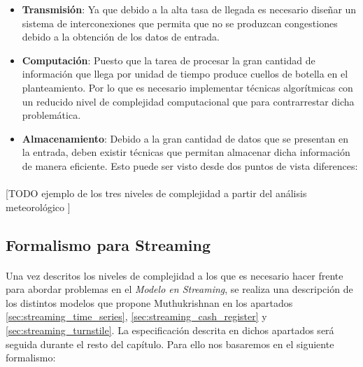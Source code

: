 \documentclass{subfiles}
\begin{document}
      \begin{itemize}

        \item \textbf{Transmisión}: Ya que debido a la alta tasa de llegada es necesario diseñar un sistema de interconexiones que permita que no se produzcan congestiones debido a la obtención de los datos de entrada.

        \item \textbf{Computación}: Puesto que la tarea de procesar la gran cantidad de información que llega por unidad de tiempo produce cuellos de botella en el planteamiento. Por lo que es necesario implementar técnicas algorítmicas con un reducido nivel de complejidad computacional que para contrarrestar dicha problemática.

        \item \textbf{Almacenamiento}: Debido a la gran cantidad de datos que se presentan en la entrada, deben existir técnicas que permitan almacenar dicha información de manera eficiente. Esto puede ser visto desde dos puntos de vista diferences: 

      \end{itemize}

      \paragraph{}
      [TODO ejemplo de los tres niveles de complejidad a partir del análisis meteorológico ]

      \subsection{Formalismo para Streaming}
      \label{sec:streaming_formalism}

        \paragraph{}
        Una vez descritos los niveles de complejidad a los que es necesario hacer frente para abordar problemas en el \emph{Modelo en Streaming}, se realiza una descripción de los distintos modelos que propone Muthukrishnan \cite{Muthukrishnan:2005:DSA:1166409.1166410} en los apartados \ref{sec:streaming_time_series}, \ref{sec:streaming_cash_register} y \ref{sec:streaming_turnstile}. La especificación descrita en dichos apartados será seguida durante el resto del capítulo. Para ello nos basaremos en el siguiente formalismo:
\end{document}
